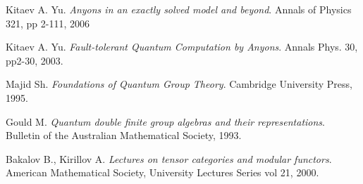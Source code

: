\documentclass{article}
\begin{document}
\begin{thebibliography}{99}
	Kitaev A. Yu. \emph{Anyons in an exactly solved model and beyond}. Annals of Physics 321, pp 2-111, 2006
    
	Kitaev A. Yu. \emph{Fault-tolerant Quantum Computation by Anyons}. Annals Phys. 30, pp2-30, 2003.
	
	Majid Sh. \emph{Foundations of Quantum Group Theory}. Cambridge University Press, 1995.
	
	Gould M. \emph{Quantum double finite group algebras and their representations}. Bulletin of the Australian Mathematical Society, 1993.

	Bakalov B., Kirillov A. \emph{Lectures on tensor categories and modular functors}. American Mathematical Society, University Lectures Series vol 21, 2000.
    
\end{thebibliography}
\end{document}
